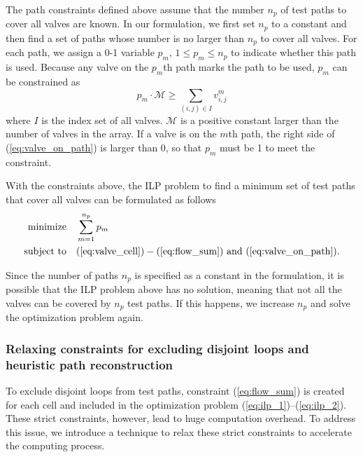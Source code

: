 The path constraints defined above assume that the number $n_p$ of test paths to
cover all valves are known. 
In our formulation, we first set $n_p$ to a constant and then
find a set of paths whose number is no larger than $n_p$ to cover all
valves. For each path, we
assign a 0-1 variable $p_m,\, 1 \le p_m \le n_p$ to indicate whether this path is used. Because any
valve on the $p_m$th path marks the path to be used, $p_m$ can be
constrained as
\begin{equation}   
\label{eq:valve_on_path}
p_m\cdot\mathcal{M} \ge \sum_{(i,j)\in I}v^m_{i,j}
\end{equation}   
where $I$ is the index set of all valves.
$\mathcal{M}$ is a positive constant larger than the number of valves in
the array. 
If a valve is on the $m$th path, the right side of
(\ref{eq:valve_on_path}) is larger than 0, so that $p_m$ must be 1 to
meet the constraint. 

With the constraints above, the ILP problem to find a minimum set of test paths 
that cover all valves can be formulated as follows
\begin{align} 
  \text{minimize} &\quad \sum_{m=1}^{n_p}p_m
\label{eq:ilp_1}\\
\text{subject to} & \quad (\ref{eq:valve_cell})-(\ref{eq:flow_sum})
\  \text{and}\  (\ref{eq:valve_on_path}).
\label{eq:ilp_2}
\end{align} 

Since the number of paths $n_p$ is specified as a constant in the formulation, 
it is possible that
the ILP problem above has no solution, meaning that not all the valves can be
covered by $n_p$ test paths. If this happens, we increase $n_p$ and solve the
optimization problem again. 

\subsubsection{Relaxing constraints for excluding disjoint loops and heuristic
path reconstruction}\label{sec:loop_relax}

To exclude disjoint loops from test paths, constraint (\ref{eq:flow_sum}) is
created for each cell and included in the optimization problem
(\ref{eq:ilp_1})--(\ref{eq:ilp_2}). These strict constraints,
however, 
lead to huge computation overhead. To address this issue, we introduce a
technique to relax these strict constraints to accelerate the 
computing process. 

